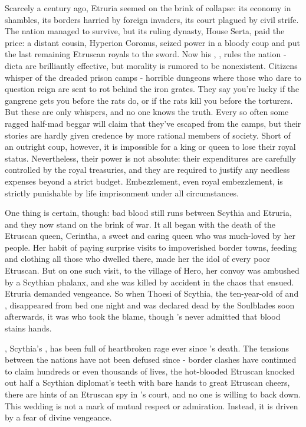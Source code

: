 \documentclass[blue]{Kos}
\begin{document}
Scarcely a century ago, Etruria seemed on the brink of collapse: its economy in shambles, its borders harried by foreign invaders, its court plagued by civil strife. The nation managed to survive, but its ruling dynasty, House Serta, paid the price: a distant cousin, Hyperion Coronus, seized power in a bloody coup and put the last remaining Etruscan royals to the sword. Now his \cEtruriaKing{\offspring}, \cEtruriaKing{}, rules the nation - \cEtruriaKing{\their} dicta are brilliantly effective, but \cEtruriaKing{\their} morality is rumored to be nonexistent. Citizens whisper of the dreaded prison camps - horrible dungeons where those who dare to question \cEtruriaKing{\their} reign are sent to rot behind the iron grates. They say you're lucky if the gangrene gets you before the rats do, or if the rats kill you before the torturers. But these are only whispers, and no one knows the truth. Every so often some ragged half-mad beggar will claim that they've escaped from the camps, but their stories are hardly given credence by more rational members of society. Short of an outright coup, however, it is impossible for a king or queen to lose their royal status. Nevertheless, their power is not absolute: their expenditures are carefully controlled by the royal treasuries, and they are required to justify any needless expenses beyond a strict budget. Embezzlement, even royal embezzlement, is strictly punishable by life imprisonment under all circumstances.

One thing is certain, though: bad blood still runs between Scythia and Etruria, and they now stand on the brink of war. It all began with the death of the Etruscan queen, Cerintha, a sweet and caring queen who was much-loved by her people. Her habit of paying surprise visits to impoverished border towns, feeding and clothing all those who dwelled there, made her the idol of every poor Etruscan. But on one such visit, to the village of Hero, her convoy was ambushed by a Scythian phalanx, and she was killed by accident in the chaos that ensued. Etruria demanded vengeance. So when \cFugitive{\Prince} Thoesi of Scythia, the ten-year-old \cFugitive{\offspring} of \cScythiaKing{\Monarch} \cScythiaKing{} and \cScythiaQueen{\Monarch} \cScythiaQueen{}, disappeared from \cFugitive{\their} bed one night and was declared dead by the Soulblades soon afterwards, it was \cEtruriaKing{} who took the blame, though \cEtruriaKing{\they}’s never admitted that \cFugitive{\their} blood stains \cEtruriaKing{\their} hands.

\cScythiaQueen{}, Scythia's \cScythiaQueen{\monarch}, has been full of heartbroken rage ever since \cScythiaQueen{\their} \cFugitive{\offspring}'s death. The tensions between the nations have not been defused since - border clashes have continued to claim hundreds or even thousands of lives, the hot-blooded Etruscan \cPoet{\prince} \cPoet{} knocked out half a Scythian diplomat's teeth with \cPoet{\their} bare hands to great Etruscan cheers, there are hints of an Etruscan spy in \cScythiaKing{\Monarch} \cScythiaKing{}'s court, and no one is willing to back down. This wedding is not a mark of mutual respect or admiration. Instead, it is driven by a fear of divine vengeance.
\end{document}

